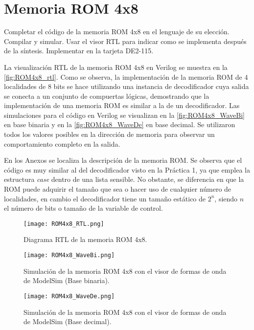 \section{Memoria ROM 4x8 \label{sec:s3}}

\begin{center}
	\begin{minipage}{12cm}
		\begin{tcolorbox}[title=Actividad 3]
			 Completar el código de la memoria ROM 4x8 en el lenguaje de su elección. Compilar y simular. Usar el visor RTL para indicar como se implementa después de la síntesis. Implementar en la tarjeta DE2-115.
		\end{tcolorbox}	
	\end{minipage}
\end{center}

La visualización RTL de la memoria ROM 4x8 en Verilog se muestra en la \autoref{fig:ROM4x8_rtl}. Como se observa, la implementación de la memoria ROM de 4 localidades de 8 bits se hace utilizando una instancia de decodificador cuya salida se conecta a un conjunto de compuertas lógicas, demostrando que la implementación de una memoria ROM es similar a la de un decodificador. Las simulaciones para el código en Verilog se visualizan en la \autoref{fig:ROM4x8_WaveBi} en base binaria y en la \autoref{fig:ROM4x8_WaveDe} en base decimal. Se utilizaron todos los valores posibles en la dirección de memoria para observar un comportamiento completo en la salida.

En los Anexos se localiza la descripción de la memoria ROM. Se observa que el código es muy similar al del decodificador visto en la Práctica 1, ya que emplea la estructura \textit{case} dentro de una lista sensible. No obstante, se diferencia en que la ROM puede adquirir el tamaño que sea o hacer uso de cualquier número de localidades, en cambio el decodificador tiene un tamaño estático de $2^{n}$, siendo $n$ el número de bits o tamaño de la variable de control.

\begin{figure}[ht]
	\centering
	\texttt{[image: ROM4x8\_RTL.png]}
	\caption{Diagrama RTL de la memoria ROM 4x8. \label{fig:ROM4x8_rtl}}
\end{figure}

\begin{figure}[ht]
	\centering
	\texttt{[image: ROM4x8\_WaveBi.png]}
	\caption{Simulación de la memoria ROM 4x8 con el visor de formas de onda de ModelSim (Base binaria). \label{fig:ROM4x8_WaveBi}}
\end{figure}

\begin{figure}[ht]
	\centering
	\texttt{[image: ROM4x8\_WaveDe.png]}
	\caption{Simulación de la memoria ROM 4x8 con el visor de formas de onda de ModelSim (Base decimal). \label{fig:ROM4x8_WaveDe}}
\end{figure}